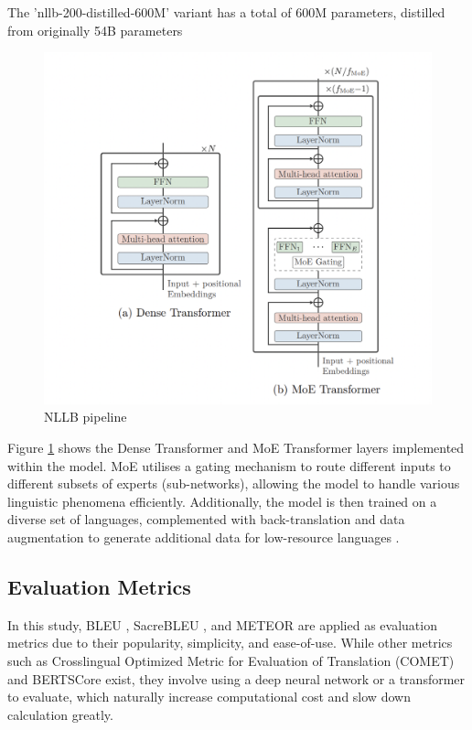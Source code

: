\documentclass[a4paper, 11pt]{article}
\begin{document}
The 'nllb-200-distilled-600M' variant has a total of 600M parameters, distilled from originally 54B parameters \cite{nllb200-2020}

\begin{figure}[htbp]
    \centering
    \includegraphics[width=0.7\linewidth]{images/nllb.png}
    \caption{NLLB pipeline \cite{nllb200-2020}}
    \label{fig:nllb}
\end{figure}

Figure \ref{fig:nllb} shows the Dense Transformer and MoE Transformer layers implemented within the model. MoE \cite{masoudnia-2012-moe} utilises a gating mechanism to route different inputs to different subsets of experts (sub-networks), allowing the model to handle various linguistic phenomena efficiently. Additionally, the model is then trained on a diverse set of languages, complemented with back-translation and data augmentation to generate additional data for low-resource languages \cite{nllb200-2020}.


\subsection{Evaluation Metrics}

In this study, BLEU \cite{papieni-2002-bleu}, SacreBLEU \cite{post-2018-sacrebleu}, and METEOR \cite{lavie-2007-meteor} are applied as evaluation metrics due to their popularity, simplicity, and ease-of-use. While other metrics such as Crosslingual Optimized Metric for Evaluation of Translation (COMET) \cite{rei-2020-comet} and BERTSCore \cite{zhang-2020-bertscore} exist, they involve using a deep neural network or a transformer to evaluate, which naturally increase computational cost and slow down calculation greatly.
\end{document}
